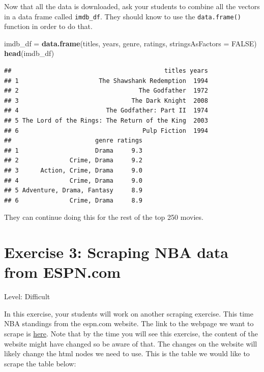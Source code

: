 \documentclass[]{book}
\newenvironment{Shaded}{\begin{snugshade}}{\end{snugshade}}
\newcommand{\DataTypeTok}[1]{\textcolor[rgb]{0.13,0.29,0.53}{#1}}
\newcommand{\KeywordTok}[1]{\textcolor[rgb]{0.13,0.29,0.53}{\textbf{#1}}}
\newcommand{\NormalTok}[1]{#1}
\newcommand{\OtherTok}[1]{\textcolor[rgb]{0.56,0.35,0.01}{#1}}
\newcommand{\StringTok}[1]{\textcolor[rgb]{0.31,0.60,0.02}{#1}}
\begin{document}
Now that all the data is downloaded, ask your students to combine all the vectors in a data frame called \texttt{imdb\_df}. They should know to use the \texttt{data.frame()} function in order to do that.

\begin{Shaded}
\begin{Highlighting}[]
\NormalTok{imdb_df =}\StringTok{ }\KeywordTok{data.frame}\NormalTok{(titles, years, genre, ratings, }\DataTypeTok{stringsAsFactors =} \OtherTok{FALSE}\NormalTok{)}
\KeywordTok{head}\NormalTok{(imdb_df)}
\end{Highlighting}
\end{Shaded}

\begin{verbatim}
##                                          titles years
## 1                      The Shawshank Redemption  1994
## 2                                 The Godfather  1972
## 3                               The Dark Knight  2008
## 4                        The Godfather: Part II  1974
## 5 The Lord of the Rings: The Return of the King  2003
## 6                                  Pulp Fiction  1994
##                       genre ratings
## 1                     Drama     9.3
## 2              Crime, Drama     9.2
## 3      Action, Crime, Drama     9.0
## 4              Crime, Drama     9.0
## 5 Adventure, Drama, Fantasy     8.9
## 6              Crime, Drama     8.9
\end{verbatim}

They can continue doing this for the rest of the top 250 movies.

\hypertarget{exercise-3-scraping-nba-data-from-espn.com}{%
\section*{Exercise 3: Scraping NBA data from ESPN.com}\label{exercise-3-scraping-nba-data-from-espn.com}}

Level: Difficult

In this exercise, your students will work on another scraping exercise. This time NBA standings from the espn.com website. The link to the webpage we want to scrape is \href{http://www.espn.com/nba/standings}{here}. Note that by the time you will see this exercise, the content of the website might have changed so be aware of that. The changes on the website will likely change the html nodes we need to use. This is the table we would like to scrape the table below:
\end{document}

